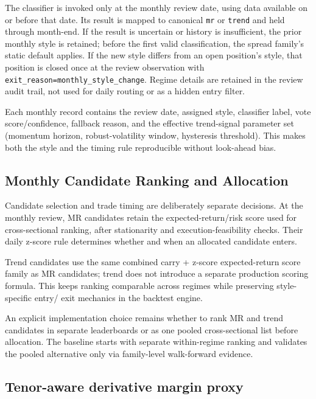 The classifier is invoked only at the monthly review date, using data available on
or before that date. Its result is mapped to canonical \texttt{mr} or \texttt{trend}
and held through month-end. If the result is uncertain or history is insufficient,
the prior monthly style is retained; before the first valid classification, the
spread family's static default applies. If the new style differs from an open
position's style, that position is closed once at the review observation with
\texttt{exit\_reason=monthly\_style\_change}. Regime details are retained in the review
audit trail, not used for daily routing or as a hidden entry filter.

Each monthly record contains the review date, assigned style, classifier label,
vote score/confidence, fallback reason, and the effective trend-signal parameter set
(momentum horizon, robust-volatility window, hysteresis threshold). This makes both
the style and the timing rule reproducible without look-ahead bias.

\subsection{Monthly Candidate Ranking and Allocation}
\label{sec:pairs-monthly-ranking}

Candidate selection and trade timing are deliberately separate decisions. At the
monthly review, MR candidates retain the expected-return/risk score used for
cross-sectional ranking, after stationarity and execution-feasibility checks. Their
daily z-score rule determines whether and when an allocated candidate enters.

Trend candidates use the same combined carry + z-score expected-return score family
as MR candidates; trend does not introduce a separate production scoring formula.
This keeps ranking comparable across regimes while preserving style-specific entry/
exit mechanics in the backtest engine.

An explicit implementation choice remains whether to rank MR and trend candidates in
separate leaderboards or as one pooled cross-sectional list before allocation. The
baseline starts with separate within-regime ranking and validates the pooled
alternative only via family-level walk-forward evidence.

\subsection{Tenor-aware derivative margin proxy}
\label{sec:alpha-tenor-aware-margin}

